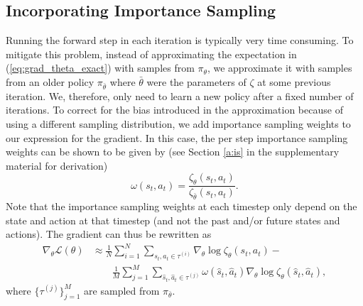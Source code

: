 \documentclass{article}
\begin{document}
\subsection{Incorporating Importance Sampling}
Running the forward step in each iteration is typically very time consuming. To mitigate this problem, instead of approximating the expectation in (\ref{eq:grad_theta_exact}) with samples from $\pi_{\theta}$, we approximate it with samples from an older policy $\pi_{\bar{\theta}}$ where $\bar{\theta}$ were the parameters of $\zeta$ at some previous iteration. We, therefore, only need to learn a new policy after a fixed number of iterations. To correct for the bias introduced in the approximation because of using a different sampling distribution, we add importance sampling weights to our expression for the gradient. In this case, the per step importance sampling weights can be shown to be given by (see Section \ref*{a:is} in the supplementary material for derivation)
\begin{equation}
	\omega(s_t,a_t) = \frac{\zeta_\theta(s_t,a_t)}{\zeta_{\bar{\theta}}(s_t,a_t)}.
	\label{eq:is_weights}
\end{equation}
Note that the importance sampling weights at each timestep only depend on the state and action at that timestep (and not the past and/or future states and actions). The gradient can thus be rewritten as
\begin{equation}
    \begin{split}
	    \nabla_\theta\mathcal{L}(\theta) &\approx \frac{1}{N}\sum_{i=1}^N\sum_{s_t,a_t\in\tau^{(i)}} \nabla_\theta\log \zeta_\theta(s_t,a_t) -\\&\qquad\frac{1}{M}\sum_{j=1}^M \sum_{\hat{s}_t,\hat{a}_t\in\tau^{(j)}} \omega(\hat{s}_t,\hat{a}_t) \nabla_\theta \log \zeta_\theta(\hat{s}_t,\hat{a}_t),
	\label{eq:grad_theta_is}
	\end{split}
\end{equation}
where $\{\tau^{(j)}\}_{j=1}^M$ are sampled from $\pi_{\bar\theta}$.
\end{document}
